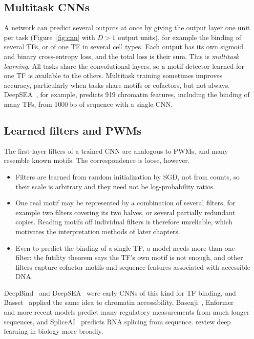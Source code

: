 \subsection{Multitask CNNs}

A network can predict several outputs at once by giving the output layer one unit per task (Figure~\ref{fig:cnn} with $D>1$ output units), for example the binding of several TFs, or of one TF in several cell types. Each output has its own sigmoid and binary cross-entropy loss, and the total loss is their sum. This is \emph{multitask learning}. All tasks share the convolutional layers, so a motif detector learned for one TF is available to the others. Multitask training sometimes improves accuracy, particularly when tasks share motifs or cofactors, but not always. DeepSEA~\citep{zhou2015}, for example, predicts 919 chromatin features, including the binding of many TFs, from 1000\,bp of sequence with a single CNN.

\subsection{Learned filters and PWMs}

The first-layer filters of a trained CNN are analogous to PWMs, and many resemble known motifs. The correspondence is loose, however.
\begin{itemize}
  \item Filters are learned from random initialization by SGD, not from counts, so their scale is arbitrary and they need not be log-probability ratios.
  \item One real motif may be represented by a combination of several filters, for example two filters covering its two halves, or several partially redundant copies. Reading motifs off individual filters is therefore unreliable, which motivates the interpretation methods of later chapters.
  \item Even to predict the binding of a single TF, a model needs more than one filter: the futility theorem says the TF's own motif is not enough, and other filters capture cofactor motifs and sequence features associated with accessible DNA.
\end{itemize}
DeepBind~\citep{alipanahi2015} and DeepSEA~\citep{zhou2015} were early CNNs of this kind for TF binding, and Basset~\citep{kelley2016} applied the same idea to chromatin accessibility. Basenji~\citep{kelley2018}, Enformer~\citep{avsec2021} and more recent models predict many regulatory measurements from much longer sequences, and SpliceAI~\citep{jaganathan2019} predicts RNA splicing from sequence. \citet{ching2018} review deep learning in biology more broadly.

